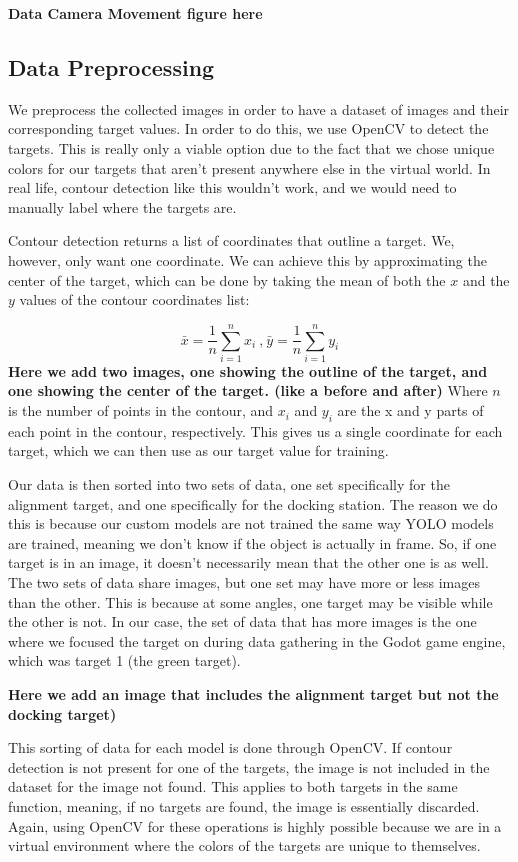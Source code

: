 \textbf{Data Camera Movement figure here}

\subsection{Data Preprocessing}
We preprocess the collected images in order to have a dataset of images and their corresponding target values. In order to do this, we use OpenCV to detect the targets. This is really only a viable option due to the fact that we chose unique colors for our targets that aren't present anywhere else in the virtual world. In real life, contour detection like this wouldn't work, and we would need to manually label where the targets are.

Contour detection returns a list of coordinates that outline a target. We, however, only want one coordinate. We can achieve this by approximating the center of the target, which can be done by taking the mean of both the \(x\) and the \(y\) values of the contour coordinates list:

\[
	\bar{x} = \frac{1}{n}\sum_{i=1}^{n} x_i ~\text{,} ~\bar{y} = \frac{1}{n}\sum_{i=1}^{n} y_i
\]
\textbf{Here we add two images, one showing the outline of the target, and one showing the center of the target. (like a before and after)}
Where \(n\) is the number of points in the contour, and \(x_i\) and \(y_i\) are the x and y parts of each point in the contour, respectively. This gives us a single coordinate for each target, which we can then use as our target value for training.

Our data is then sorted into two sets of data, one set specifically for the alignment target, and one specifically for the docking station. The reason we do this is because our custom models are not trained the same way YOLO models are trained, meaning we don't know if the object is actually in frame. So, if one target is in an image, it doesn't necessarily mean that the other one is as well. The two sets of data share images, but one set may have more or less images than the other. This is because at some angles, one target may be visible while the other is not. In our case, the set of data that has more images is the one where we focused the target on during data gathering in the Godot game engine, which was target 1 (the green target). 

\textbf{Here we add an image that includes the alignment target but not the docking target)}

This sorting of data for each model is done through OpenCV. If contour detection is not present for one of the targets, the image is not included in the dataset for the image not found. This applies to both targets in the same function, meaning, if no targets are found, the image is essentially discarded. Again, using OpenCV for these operations is highly possible because we are in a virtual environment where the colors of the targets are unique to themselves.

